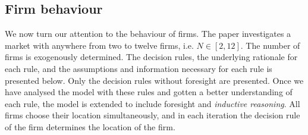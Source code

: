 \documentclass[preprint, 12pt]{elsarticle}
\newcommand*{\TODO}{\textbf{\fbox{??}}}%
\newcommand{\Figtext}[1]{%
	\begin{tablenotes}[para,flushleft]
		\hangindent=1em
		\footnotesize
		\raggedright
		#1
	\end{tablenotes}
}
\newcommand{\Fignote}[1]{\Figtext{\emph{Note:~}~#1}}
\begin{document}

\subsection{Firm behaviour}

We now turn our attention to the behaviour of firms. The paper investigates a market with anywhere from two to twelve firms, i.e. $N \in [2,12]$. The number of firms is exogenously determined. The decision rules, the underlying rationale for each rule, and the assumptions and information necessary for each rule is presented below. Only the decision rules without foresight are presented. Once we have analysed the model with these rules and gotten a better understanding of each rule, the model is extended to include foresight and \emph{inductive reasoning}. All firms choose their location simultaneously, and in each iteration the decision rule of the firm determines the location of the firm.
\end{document}

